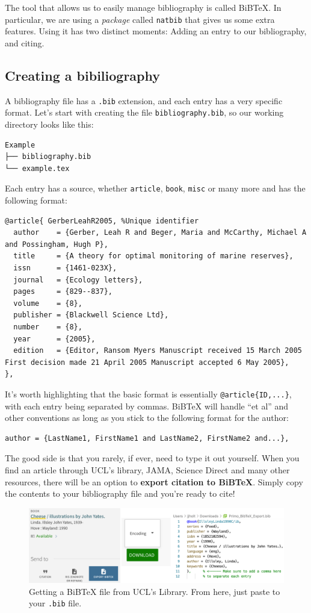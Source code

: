 The tool that allows us to easily manage bibliography is called BiBTeX. In particular, we are using a \emph{package} called \verb|natbib| that gives us some extra features.
Using it has two distinct moments: Adding an entry to our bibliography, and citing.

\subsection{Creating a bibiliography}
A bibliography file has a \verb|.bib| extension, and each entry has a very specific format.
Let's start with creating the file \verb|bibliography.bib|, so our working directory looks like this:
\begin{verbatim}
Example
├── bibliography.bib
└── example.tex
\end{verbatim}

Each entry has a source, whether \verb|article|, \verb|book|, \verb|misc| or many more and has the following format:
\begin{lstlisting}
@article{ GerberLeahR2005, %Unique identifier
  author    = {Gerber, Leah R and Beger, Maria and McCarthy, Michael A and Possingham, Hugh P},
  title     = {A theory for optimal monitoring of marine reserves},
  issn      = {1461-023X},
  journal   = {Ecology letters},
  pages     = {829--837},
  volume    = {8},
  publisher = {Blackwell Science Ltd},
  number    = {8},
  year      = {2005},
  edition   = {Editor, Ransom Myers Manuscript received 15 March 2005 First decision made 21 April 2005 Manuscript accepted 6 May 2005},
},
\end{lstlisting}

It's worth highlighting that the basic format is essentially \verb|@article{ID,...}|, with each entry being separated by commas.
BiBTeX will handle ``et al'' and other conventions as long as you stick to the following format for the author:
\begin{lstlisting}
author = {LastName1, FirstName1 and LastName2, FirstName2 and...},
\end{lstlisting}

The good side is that you rarely, if ever, need to type it out yourself.
When you find an article through UCL's library, JAMA, Science Direct and many other resources, there will be an option to \textbf{export citation to BiBTeX}.
Simply copy the contents to your bibliography file and you're ready to cite!
\begin{figure}[h]
  \centering
  \includegraphics[width=\textwidth]{figures/ucl-lib.png}
  \caption{Getting a BiBTeX file from UCL's Library. From here, just paste to your \texttt{.bib} file.}
  \label{fig:ucl-lib}
\end{figure}

